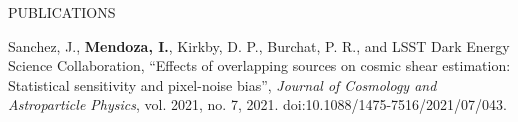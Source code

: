 \begin{rSection}{PUBLICATIONS}
%
\vspace*{-1em}
\item Sanchez, J., \textbf{Mendoza, I.}, Kirkby, D. P., Burchat, P. R., and LSST Dark Energy Science Collaboration, “Effects of overlapping sources on cosmic shear estimation: Statistical sensitivity and pixel-noise bias”, \textit{Journal of Cosmology and Astroparticle Physics}, vol. 2021, no. 7, 2021. doi:10.1088/1475-7516/2021/07/043.
\end{rSection}




